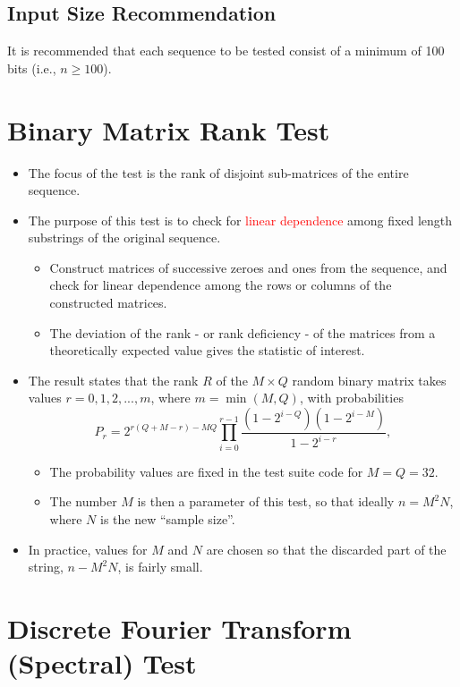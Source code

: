 \documentclass[12pt,openany]{book}
\theoremstyle{definition}
\begin{document}
	\subsection*{Input Size Recommendation}
	It is recommended that each sequence to be tested consist of a minimum of 100 bits (i.e., \( n \geq 100 \)).

	\newpage
	\section{Binary Matrix Rank Test}
	
	\begin{itemize}
		\item The focus of the test is the rank of disjoint sub-matrices of the entire sequence.
		\item The purpose of this test is to check for \textcolor{red}{linear dependence} among fixed length substrings of the original sequence.
		\begin{itemize}
			\item Construct matrices of successive zeroes and ones from the sequence, and check for linear dependence among the rows or columns of the constructed matrices.
			\item The deviation of the rank - or rank deficiency - of the matrices from a theoretically expected value gives the statistic of interest.
		\end{itemize}
		\item The result states that the rank \( R \) of the \( M \times Q \) random binary matrix takes values \( r = 0, 1, 2, ..., m \), where \( m = \min(M, Q) \), with probabilities
		\[
		P_r = 2^{r(Q+M-r)-MQ}\prod_{i=0}^{r-1}\frac{(1-2^{i-Q})(1-2^{i-M})}{1-2^{i-r}},
		\]
		\begin{itemize}
			\item The probability values are fixed in the test suite code for \( M = Q = 32 \).
			\item The number \( M \) is then a parameter of this test, so that ideally \( n = M^2N \), where \( N \) is the new ``sample size''.
		\end{itemize}
		\item In practice, values for \( M \) and \( N \) are chosen so that the discarded part of the string, \( n - M^2N \), is fairly small.
	\end{itemize}
	
	\section*{Discrete Fourier Transform (Spectral) Test}
	
\end{document}
